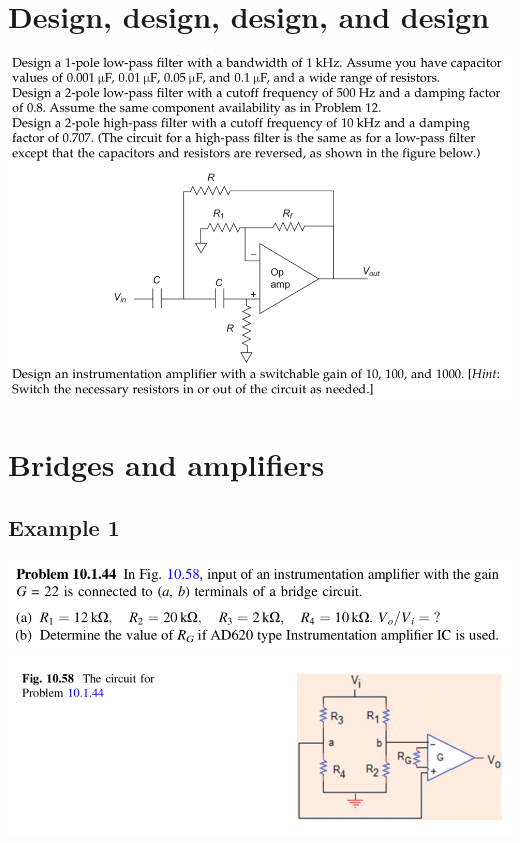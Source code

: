 \documentclass[11pt]{book}
\begin{document}
\newpage

\section{Design, design, design, and design}
\begin{center}
	\includegraphics[width=\textwidth]{figures/q3.08.png}
\end{center}

\newpage

\section{Bridges and amplifiers}
\subsection{Example 1}
\begin{center}
	\includegraphics[width=\textwidth]{figures/q3.20.png} \\
	\includegraphics[width=\textwidth]{figures/q3.21.png}
\end{center}
\newpage
\end{document}
